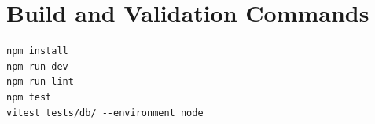 \documentclass[11pt]{article}
\begin{document}
\section{Build and Validation Commands}
\begin{lstlisting}[style=repo,basicstyle=\ttfamily\small]
npm install
npm run dev
npm run lint
npm test
vitest tests/db/ --environment node
\end{lstlisting}
\end{document}
